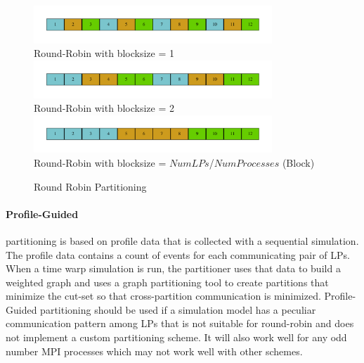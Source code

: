 \documentclass[11pt]{book}
\begin{document}
\begin{figure}
  \begin{center}
    \includegraphics[width=0.8\textwidth,keepaspectratio,quiet]{figs/graphviz/round_robin_partitioning.pdf} \\
    Round-Robin with blocksize = 1 \\
    \includegraphics[width=0.8\textwidth,keepaspectratio,quiet]{figs/graphviz/block_rr_partitioning.pdf} \\
    Round-Robin with blocksize = 2 \\
    \includegraphics[width=0.8\textwidth,keepaspectratio,quiet]{figs/graphviz/block_partitioning.pdf} \\
    Round-Robin with blocksize = $NumLPs$/$NumProcesses$ (Block) \\
  \end{center}
  \caption{Round Robin Partitioning}\label{round_robin_partitioning}
\end{figure}

\paragraph{Profile-Guided} partitioning is based on profile data that is collected with a
sequential simulation. The profile data contains a count of events for each communicating pair
of LPs. When a time warp simulation is run, the partitioner uses that data to build a weighted
graph and uses a graph partitioning tool to create partitions that minimize the cut-set so that
cross-partition communication is minimized. Profile-Guided partitioning should be used if
a simulation model has a peculiar communication pattern among LPs that is not suitable for round-robin
and does not implement a custom partitioning scheme. It will also work well for any odd number
MPI processes which may not work well with other schemes.
\end{document}
